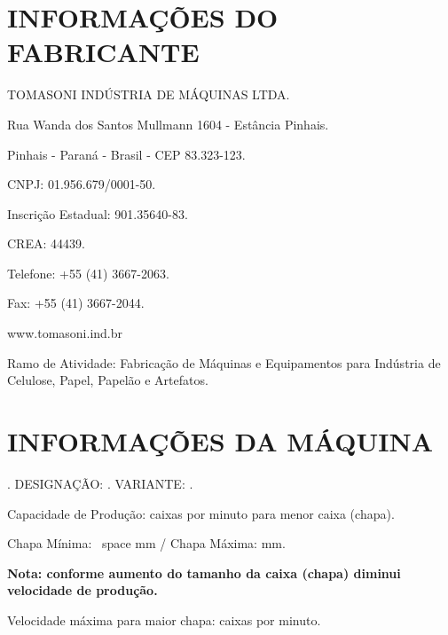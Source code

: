 \thispagestyle{fancy}

\vspace*{40 pt}

\section{\large{INFORMAÇÕES DO FABRICANTE}}

TOMASONI INDÚSTRIA DE MÁQUINAS LTDA.

Rua Wanda dos Santos Mullmann 1604 - Estância Pinhais.

Pinhais - Paraná - Brasil - CEP 83.323-123.

CNPJ: 01.956.679/0001-50.

Inscrição Estadual: 901.35640-83.

CREA: 44439.

Telefone: +55 (41) 3667-2063.

Fax: +55 (41) 3667-2044.

www.tomasoni.ind.br

Ramo de Atividade: Fabricação de Máquinas e Equipamentos para Indústria de Celulose, Papel, Papelão e Artefatos.

\section{\large{INFORMAÇÕES DA MÁQUINA}}

\machineName \space. DESIGNAÇÃO: \machineShortName. VARIANTE: \variant.

Capacidade de Produção: \productionCapacityminimumSheet \space caixas por minuto para menor caixa (chapa).

Chapa Mínima: \minimumSheet \ space mm / Chapa Máxima: \maximumSheet \space mm.

\textbf{Nota: conforme aumento do tamanho da caixa (chapa) diminui velocidade de produção.}

Velocidade máxima para maior chapa: \productionCapacitymaximumSheet \space caixas por minuto.

